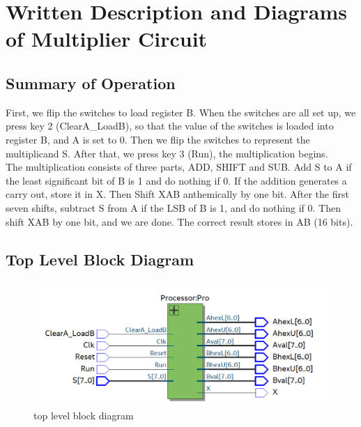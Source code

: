 \documentclass[12pt]{article}
\begin{document}
\section{Written Description and Diagrams of Multiplier Circuit}
\subsection{Summary of Operation}
First, we flip the switches to load register B. When the switches are all set up, we press key 2 (ClearA\_LoadB), so that the value of the switches is loaded into register B, and A is set to 0. Then we flip the switches to represent the multiplicand S. After that, we press key 3 (Run), the multiplication begins. \\

The multiplication consists of three parts, ADD, SHIFT and SUB. Add S to A if the least significant bit of B is 1 and do nothing if 0. If the addition generates a carry out, store it in X. Then Shift XAB anthemically by one bit. After the first seven shifts, subtract S from A if the LSB of B is 1, and do nothing if 0. Then shift XAB by one bit, and we are done. The correct result stores in AB (16 bits).

\subsection{Top Level Block Diagram}
\begin{figure}[H]
    \centering
    \includegraphics[width=15cm]{top_level.png}
    \caption{top level block diagram}
\end{figure}
\end{document}
